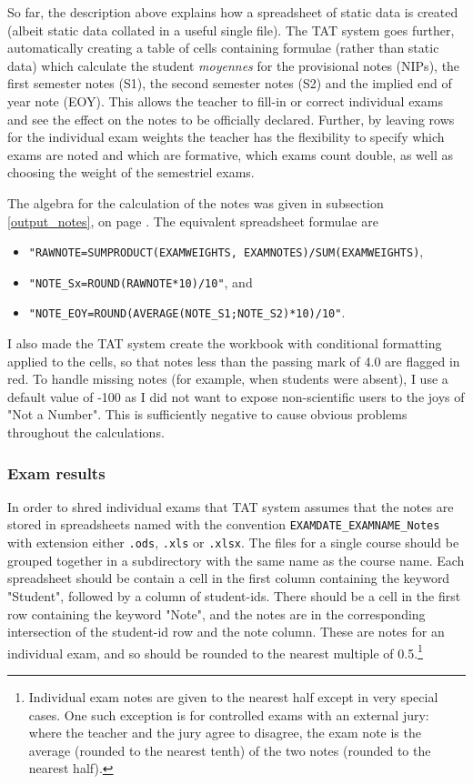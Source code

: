 \documentclass[10pt]{article}
\begin{document}
So far, the description above explains how a spreadsheet of static data is created (albeit static data collated in a useful single file). The TAT system goes further, automatically creating a table of cells containing formulae (rather than static data) which calculate the student \emph{moyennes} for the provisional notes (NIPs), the first semester notes (S1), the second semester notes (S2) and the implied end of year note (EOY). This allows the teacher to fill-in or correct individual exams and see the effect on the notes to be officially declared. Further, by leaving rows for the individual exam weights the teacher has the flexibility to specify which exams are noted and which are formative, which exams count double, as well as choosing the weight of the semestriel exams.

The algebra for the calculation of the notes was given in subsection \ref{output_notes}, on page \pageref{output_notes}. The equivalent spreadsheet formulae are 
\begin{itemize}
\item \texttt{"RAWNOTE=SUMPRODUCT(EXAMWEIGHTS, EXAMNOTES)/SUM(EXAMWEIGHTS)},
\item \texttt{"NOTE\_Sx=ROUND(RAWNOTE*10)/10"}, and
\item \texttt{"NOTE\_EOY=ROUND(AVERAGE(NOTE\_S1;NOTE\_S2)*10)/10"}.
\end{itemize}

I also made the TAT system create the workbook with conditional formatting applied to the cells, so that notes less than the passing mark of 4.0 are flagged in red. To handle missing notes (for example, when students were absent), I use a default value of -100 as I did not want to expose non-scientific users to the joys of "Not a Number". This is sufficiently negative to cause obvious problems throughout the calculations.

\subsubsection{Exam results}
In order to shred individual exams that TAT system assumes that the notes are stored in spreadsheets named with the convention \texttt{EXAMDATE\_EXAMNAME\_Notes} with extension either \texttt{.ods}, \texttt{.xls} or \texttt{.xlsx}. The files for a single course should be grouped together in a subdirectory with the same name as the course name. Each spreadsheet should be contain a cell in the first column containing the keyword "Student", followed by a column of student-ids. There should be a cell in the first row containing the keyword "Note", and the notes are in the corresponding intersection of the student-id row and the note column. These are notes for an individual exam, and so should be rounded to the nearest multiple of 0.5.\footnote{Individual exam notes are given to the nearest half except in very special cases. One such exception is for controlled exams with an external jury: where the teacher and the jury agree to disagree, the exam note is the average (rounded to the nearest tenth) of the two notes (rounded to the nearest half).}
\end{document}
